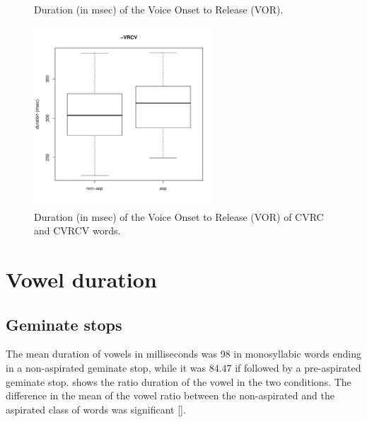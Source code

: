 \documentclass[11pt,a4paper,openany]{memoir}\usepackage[]{graphicx}\usepackage[]{color}
\newenvironment{knitrout}{}{} %
\begin{document}
\begin{figure}
\begin{subfigure}{.5\textwidth}
\begin{knitrout}
\end{knitrout}
\end{subfigure}
\caption{Duration (in msec) of the Voice Onset to Release (VOR).}
\label{f:vor}
\end{figure}

\begin{figure}
\centering
\begin{knitrout}
\color{fgcolor}
\includegraphics[width=0.6\textwidth]{img/di-rho-vor-1} 

\end{knitrout}
\caption{Duration (in msec) of the Voice Onset to Release (VOR) of CVRC and CVRCV words.}
\label{f:vor-rho}
\end{figure}


\section{Vowel duration}
\label{s:vow-dur}

\subsection{Geminate stops}


The mean duration of vowels in milliseconds was 98 in monosyllabic words ending in a non-aspirated geminate stop, while it was 84.47 if followed by a pre-aspirated geminate stop.
 shows the ratio duration of the vowel in the two conditions.
The difference in the mean of the vowel ratio between the non-aspirated and the aspirated class of words was significant [].
\end{document}
